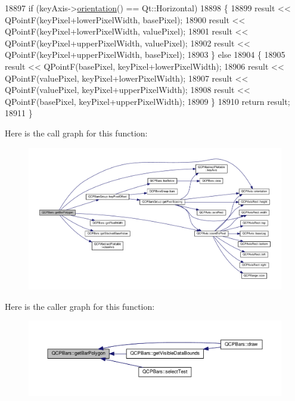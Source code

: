 \begin{DoxyCode}
18897   \textcolor{keywordflow}{if} (keyAxis->\hyperlink{class_q_c_p_axis_a57483f2f60145ddc9e63f3af53959265}{orientation}() == Qt::Horizontal)
18898   \{
18899     result << QPointF(keyPixel+lowerPixelWidth, basePixel);
18900     result << QPointF(keyPixel+lowerPixelWidth, valuePixel);
18901     result << QPointF(keyPixel+upperPixelWidth, valuePixel);
18902     result << QPointF(keyPixel+upperPixelWidth, basePixel);
18903   \} \textcolor{keywordflow}{else}
18904   \{
18905     result << QPointF(basePixel, keyPixel+lowerPixelWidth);
18906     result << QPointF(valuePixel, keyPixel+lowerPixelWidth);
18907     result << QPointF(valuePixel, keyPixel+upperPixelWidth);
18908     result << QPointF(basePixel, keyPixel+upperPixelWidth);
18909   \}
18910   \textcolor{keywordflow}{return} result;
18911 \}
\end{DoxyCode}


Here is the call graph for this function\+:\nopagebreak
\begin{figure}[H]
\begin{center}
\leavevmode
\includegraphics[width=350pt]{class_q_c_p_bars_a1d118a76662cfd691a78c6f573e3f78c_cgraph}
\end{center}
\end{figure}




Here is the caller graph for this function\+:\nopagebreak
\begin{figure}[H]
\begin{center}
\leavevmode
\includegraphics[width=350pt]{class_q_c_p_bars_a1d118a76662cfd691a78c6f573e3f78c_icgraph}
\end{center}
\end{figure}


